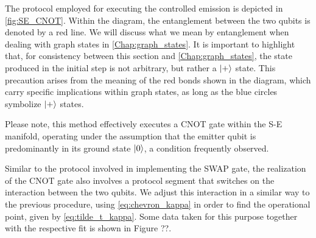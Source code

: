 The protocol employed for executing the controlled emission is depicted in \cref{fig:SE_CNOT}.
Within the diagram, the entanglement between the two qubits is denoted by a red line. We will discuss what we mean by entanglement when dealing with graph states in \cref{Chap:graph_states}.
It is important to highlight that, for consistency between this section and \cref{Chap:graph_states}, the state produced in the initial step is not arbitrary, but rather a $\ket{+}$ state.
This precaution arises from the meaning of the red bonds shown in the diagram, which carry specific implications within graph states, as long as the blue circles symbolize $\ket{+}$ states.

Please note, this method effectively executes a CNOT gate within the S-E manifold, operating under the assumption that the emitter qubit is predominantly in its ground state $\ket{0}$, a condition frequently observed.

Similar to the protocol involved in implementing the SWAP gate, the realization of the CNOT gate also involves a protocol segment that switches on the interaction between the two qubits. 
We adjust this interaction in a similar way to the previous procedure, using \cref{eq:chevron_kappa}  in order to find the operational point, given by \cref{eq:tilde_t_kappa}.
Some data taken for this purpose together with the respective fit is shown in Figure ??.
